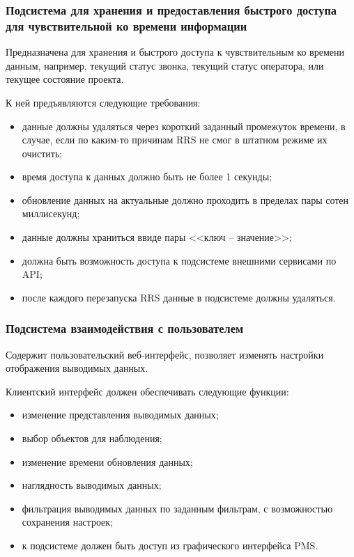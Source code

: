 \subsubsection{Подсистема для хранения и предоставления быстрого доступа для чувствительной ко времени информации}

Предназначена для хранения и быстрого доступа к чувствительным ко времени данным,
например, текущий статус звонка, текущий статус оператора, или текущее состояние проекта.

К ней предъявляются следующие требования:
\begin{itemize}
    \item данные должны удаляться через короткий заданный промежуток времени, в случае,
    если по каким-то причинам RRS не смог в штатном режиме их очистить;
    \item время доступа к данных должно быть не более 1 секунды;
    \item обновление данных на актуальные должно проходить в пределах пары сотен миллисекунд;
    \item данные должны храниться ввиде пары <<ключ -- значение>>;
    \item должна быть возможность доступа к подсистеме внешними сервисами по API;
    \item после каждого перезапуска RRS данные в подсистеме должны удаляться.
\end{itemize}

\subsubsection{Подсистема взаимодействия с пользователем}
\label{subsubsec:подсистема-взаимодействия-с-пользователем}

Содержит пользовательский веб-интерфейс, позволяет изменять настройки отображения выводимых данных.

Клиентский интерфейс должен обеспечивать следующие функции:
\begin{itemize}
    \item изменение представления выводимых данных;
    \item выбор объектов для наблюдения;
    \item изменение времени обновления данных;
    \item наглядность выводимых данных;
    \item фильтрация выводимых данных по заданным фильтрам, с возможностью сохранения настроек;
    \item к подсистеме должен быть доступ из графического интерфейса PMS\@.
\end{itemize}

